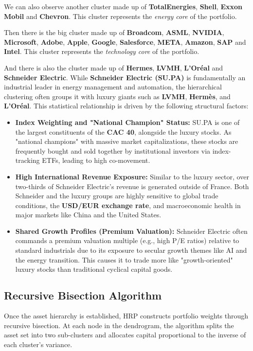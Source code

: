 \documentclass[11pt,a4paper]{article}
\begin{document}
We can also observe another cluster made up of \textbf{TotalEnergies}, \textbf{Shell}, \textbf{Exxon Mobil} and \textbf{Chevron}. This cluster represents the \textit{energy core} of the portfolio.
\par
Then there is the big cluster made up of \textbf{Broadcom}, \textbf{ASML}, \textbf{NVIDIA}, \textbf{Microsoft}, \textbf{Adobe}, \textbf{Apple}, \textbf{Google}, \textbf{Salesforce}, \textbf{META}, \textbf{Amazon}, \textbf{SAP} and \textbf{Intel}. This cluster represents the \textit{technology core} of the portfolio.
\par

And there is also the cluster made up of \textbf{Hermes}, \textbf{LVMH}, \textbf{L'Oréal} and \textbf{Schneider Electric}.
While \textbf{Schneider Electric (SU.PA)} is fundamentally an industrial leader in energy management and automation, the hierarchical clustering often groups it with luxury giants such as \textbf{LVMH}, \textbf{Hermès}, and \textbf{L'Oréal}. This statistical relationship is driven by the following structural factors:

\begin{itemize} 
    \item \textbf{Index Weighting and "National Champion" Status:} SU.PA is one of the largest constituents of the \textbf{CAC 40}, alongside the luxury stocks. As "national champions" with massive market capitalizations, these stocks are frequently bought and sold together by institutional investors via index-tracking ETFs, leading to high co-movement. 
    \item \textbf{High International Revenue Exposure:} Similar to the luxury sector, over two-thirds of Schneider Electric's revenue is generated outside of France. Both Schneider and the luxury groups are highly sensitive to global trade conditions, the \textbf{USD/EUR exchange rate}, and macroeconomic health in major markets like China and the United States. 
    \item \textbf{Shared Growth Profiles (Premium Valuation):} Schneider Electric often commands a premium valuation multiple (e.g., high P/E ratios) relative to standard industrials due to its exposure to secular growth themes like AI and the energy transition. This causes it to trade more like "growth-oriented" luxury stocks than traditional cyclical capital goods. 
\end{itemize}

\subsection{Recursive Bisection Algorithm}
Once the asset hierarchy is established, HRP constructs portfolio weights through recursive bisection. At each node in the dendrogram, the algorithm splits the asset set into two sub-clusters and allocates capital proportional to the inverse of each cluster's variance.
\end{document}
